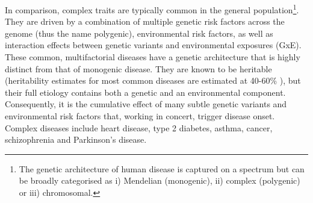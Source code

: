 

In comparison, complex traits are typically common in the general population\footnote{The genetic architecture of human disease is captured on a spectrum \cite{manolio2009finding} but can be broadly categorised as i) Mendelian (monogenic), ii) complex (polygenic) or iii) chromosomal.}.
They are driven by a combination of multiple genetic risk factors across the genome (thus the name polygenic), environmental risk factors, as well as interaction effects between genetic variants and environmental exposures (GxE).
These common, multifactorial diseases have a genetic architecture that is highly distinct from that of monogenic disease. 
They are known to be heritable (heritability estimates for most common diseases are estimated at 40-60\% \cite{manolio2009finding, prokopenko2009variants, kathiresan2008six, zeggini2008meta, harley2008genome}), but their full etiology contains both a genetic and an environmental component.
Consequently, it is the cumulative effect of many subtle genetic variants and environmental risk factors that, working in concert, trigger disease onset.
Complex diseases include heart disease, type 2 diabetes, asthma, cancer, schizophrenia and Parkinson's disease.\\

